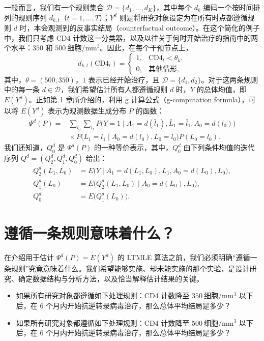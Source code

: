 一般而言，我们有一个规则集合 $\mathcal D=\{d_1,\ldots,d_K\}$，其中每个 $d_k$ 编码一个按时间排列的规则序列 $d_{k,t}$（$t=1,\ldots,T$）；$Y^d$ 则是将研究对象设定为在所有时点都遵循规则 $d$ 时，本会观测到的反事实结局（counterfactual outcome）。在这个简化的例子中，我们只考虑 CD4 计数这一分类器，以及以往关于何时开始治疗的指南中的两个水平：$350$ 和 $500\ \text{细胞}/\mathrm{mm}^3$。因此，在每个干预节点上，
\[
 d_{k,t}(\mathrm{CD4}_t)=
 \begin{cases}
  1,&\mathrm{CD4}_t<\theta_k,\\
  0,&\text{其他情形},
 \end{cases}
\]
其中，$\theta=(500,350)$，$1$ 表示已经开始治疗，且 $\mathcal D=\{d_1,d_2\}$。对于这两条规则中的每一条 $d\in\mathcal D$，我们希望估计所有人都遵循规则 $d$ 时，$Y$ 的总体均值，即 $E(Y^d)$。正如第 1 章所介绍的，利用 g 计算公式（g-computation formula），可以将 $E(Y^d)$ 表示为观测数据生成分布 $P$ 的函数：
\[
 \begin{aligned}
 \Psi^d(P)={}&\sum_{l_0}\sum_{l_1}
 P\bigl(Y=1\mid A_1=d(\bar l_1),\bar L_1=\bar l_1,A_0=d(l_0)\bigr)\\
 &{}\times P\bigl(L_1=l_1\mid A_0=d(l_0),L_0=l_0\bigr)P(L_0=l_0).
 \end{aligned}
\]
我们还知道，$Q_0^d$ 是 $\Psi^d(P)$ 的一种等价表示，其中，$Q_0^d$ 由下列条件均值的迭代序列 $Q^d=(Q_2^d,Q_1^d,Q_0^d)$ 给出：
\[
 \begin{aligned}
 Q_2^d(L_1,L_0)
  &=E\bigl(Y\mid A_1=d(L_1,L_0),L_1,A_0=d(L_0),L_0\bigr),\\
 Q_1^d(L_0)
  &=E\bigl(Q_2^d(L_1,L_0)\mid A_0=d(L_0),L_0\bigr),\\
 Q_0^d&=E\bigl(Q_1^d(L_0)\bigr).
 \end{aligned}
\]

\section{遵循一条规则意味着什么？}
\label{sec:ch04-following-rule}

在介绍用于估计 $\Psi^d(P)=E(Y^d)$ 的 LTMLE 算法之前，我们必须明确“遵循一条规则”究竟意味着什么。我们希望能够实施、却未能实施的那个实验，是设计研究、确定数据结构与分析方法，以及恰当解释估计结果的关键。
\begin{itemize}
 \item 如果所有研究对象都遵循如下处理规则：CD4 计数降至 $350\ \text{细胞}/\mathrm{mm}^3$ 以下后，在 6 个月内开始抗逆转录病毒治疗，那么总体平均结局是多少？
 \item 如果所有研究对象都遵循如下处理规则：CD4 计数降至 $500\ \text{细胞}/\mathrm{mm}^3$ 以下后，在 6 个月内开始抗逆转录病毒治疗，那么总体平均结局是多少？
\end{itemize}

